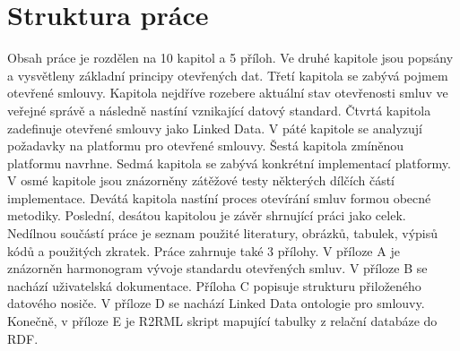 \section{Struktura práce}

Obsah práce je rozdělen na 10 kapitol a 5 příloh. Ve druhé kapitole jsou popsány a vysvětleny základní principy otevřených dat. Třetí kapitola se zabývá pojmem otevřené smlouvy. Kapitola nejdříve rozebere aktuální stav otevřenosti smluv ve veřejné správě a následně nastíní vznikající datový standard. Čtvrtá kapitola zadefinuje otevřené smlouvy jako Linked Data. V páté kapitole se analyzují požadavky na platformu pro otevřené smlouvy. Šestá kapitola zmíněnou platformu navrhne. Sedmá kapitola se zabývá konkrétní implementací platformy. V osmé kapitole jsou znázorněny zátěžové testy některých dílčích částí implementace. Devátá kapitola nastíní proces otevírání smluv formou obecné metodiky. Poslední, desátou kapitolou je závěr shrnující práci jako celek. Nedílnou součástí práce je seznam použité literatury, obrázků, tabulek, výpisů kódů a použitých zkratek. Práce zahrnuje také 3 přílohy. V příloze A je znázorněn harmonogram vývoje standardu otevřených smluv. V příloze B se nachází uživatelská dokumentace. Příloha C popisuje strukturu přiloženého datového nosiče. V příloze D se nachází Linked Data ontologie pro smlouvy. Konečně, v příloze E je R2RML skript mapující tabulky z relační databáze do RDF.

